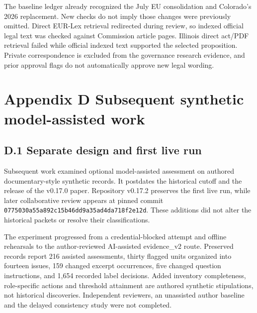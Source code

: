 \documentclass[11pt]{article}
\begin{document}
The baseline ledger already recognized the July EU consolidation and Colorado's 2026 replacement. New checks do not imply those changes were previously omitted. Direct EUR-Lex retrieval redirected during review, so indexed official legal text was checked against Commission article pages. Illinois direct act/PDF retrieval failed while official indexed text supported the selected proposition. Private correspondence is excluded from the governance research evidence, and prior approval flags do not automatically approve new legal wording.

\clearpage
{}
\section*{Appendix D Subsequent synthetic model-assisted work}

\subsection*{D.1 Separate design and first live run}

Subsequent work examined optional model-assisted assessment on authored documentary-style synthetic records. It postdates the historical cutoff and the release of the v0.17.0 paper. Repository v0.17.2 preserves the first live run, while later collaborative review appears at pinned commit \texttt{0775030a\allowbreak{}55a892c1\allowbreak{}5b46dd9a\allowbreak{}35ad4da7\allowbreak{}18f2e12d}. These additions did not alter the historical packets or resolve their classifications.

The experiment progressed from a credential-blocked attempt and offline rehearsals to the author-reviewed AI-assisted evidence\_v2 route. Preserved records report 216 assisted assessments, thirty flagged units organized into fourteen issues, 159 changed excerpt occurrences, five changed question instructions, and 1,654 recorded label decisions. Added inventory completeness, role-specific actions and threshold attainment are authored synthetic stipulations, not historical discoveries. Independent reviewers, an unassisted author baseline and the delayed consistency study were not completed.
\end{document}
